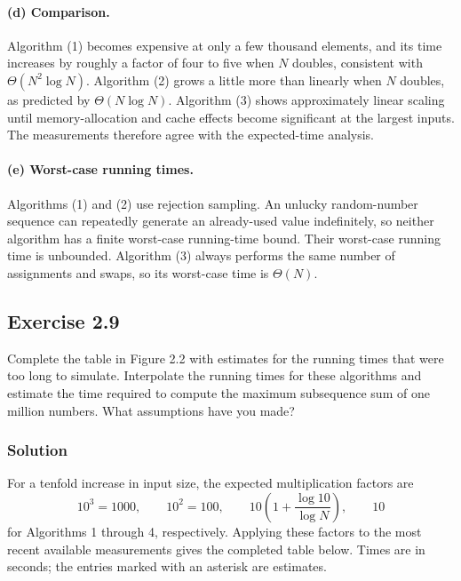 \documentclass[12pt,a4paper]{article}
\begin{document}
\paragraph{(d) Comparison.}
Algorithm (1) becomes expensive at only a few thousand elements, and
its time increases by roughly a factor of four to five when $N$ doubles,
consistent with $\Theta(N^2\log N)$. Algorithm (2) grows a little more
than linearly when $N$ doubles, as predicted by $\Theta(N\log N)$.
Algorithm (3) shows approximately linear scaling until memory-allocation
and cache effects become significant at the largest inputs. The
measurements therefore agree with the expected-time analysis.

\paragraph{(e) Worst-case running times.}
Algorithms (1) and (2) use rejection sampling. An unlucky random-number
sequence can repeatedly generate an already-used value indefinitely, so
neither algorithm has a finite worst-case running-time bound. Their
worst-case running time is unbounded. Algorithm (3) always performs the
same number of assignments and swaps, so its worst-case time is
$\Theta(N)$.

\subsection*{\color{sectionnavy}Exercise 2.9}

\noindent
Complete the table in Figure 2.2 with estimates for the running times
that were too long to simulate. Interpolate the running times for these
algorithms and estimate the time required to compute the maximum
subsequence sum of one million numbers. What assumptions have you made?

\subsubsection*{\color{sectionnavy}Solution}

For a tenfold increase in input size, the expected multiplication
factors are
\[
10^3=1000,\qquad 10^2=100,\qquad
10\left(1+\frac{\log 10}{\log N}\right),\qquad 10
\]
for Algorithms 1 through 4, respectively. Applying these factors to the
most recent available measurements gives the completed table below.
Times are in seconds; the entries marked with an asterisk are estimates.
\end{document}
